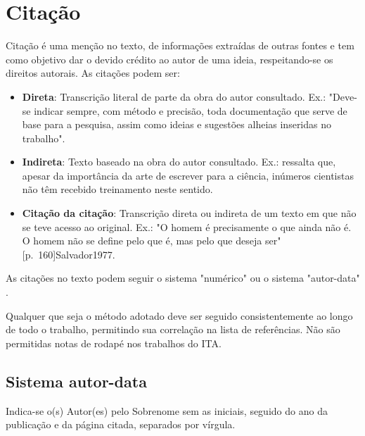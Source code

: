 
\section{Citação}

Citação é uma menção no texto, de informações extraídas de outras fontes \cite{ABNT2023}
e tem como objetivo dar o devido crédito ao autor de uma ideia, respeitando-se os direitos autorais.
As citações podem ser:

\begin{itemize}
  \item \textbf{Direta}: Transcrição literal de parte da obra do autor consultado. Ex.: "Deve-se indicar sempre, com método e precisão, toda documentação que serve de base para a pesquisa, assim como ideias e sugestões alheias inseridas no trabalho". \cite[p. 97]{Cervo1978}
  \item \textbf{Indireta}: Texto baseado na obra do autor consultado. Ex.: \cite{Barras1979} ressalta que, apesar da importância da arte de escrever para a ciência, inúmeros cientistas não têm recebido treinamento neste sentido.
  \item \textbf{Citação da citação}: Transcrição direta ou indireta de um texto em que não se teve acesso ao original. Ex.: "O homem é precisamente o que ainda não é. O homem não se define pelo que é, mas pelo que deseja ser" [p.~160]{Salvador1977}.
\end{itemize}

As citações no texto podem seguir o sistema "numérico" ou o sistema "autor-data" \cite{ABNT2023}.

Qualquer que seja o método adotado deve ser seguido consistentemente ao longo de todo o trabalho, permitindo sua correlação na lista de referências. Não são permitidas notas de rodapé nos trabalhos do \ac{ITA}.

\subsection{Sistema autor-data}

Indica-se o(s) Autor(es) pelo Sobrenome sem as iniciais, seguido do ano da publicação e da página citada, separados por vírgula.

